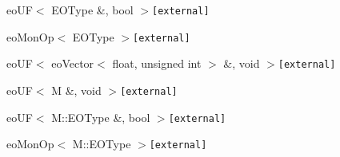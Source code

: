 \begin{CompactList}
\begin{CompactList}
\begin{CompactList}
\item {}
\begin{CompactList}
\item {}
\end{CompactList}
\end{CompactList}
\item eo\-UF$<$ EOType \&, bool $>${\tt  [external]}\begin{CompactList}
\item eo\-Mon\-Op$<$ EOType $>${\tt  [external]}\begin{CompactList}
\item {}
\end{CompactList}
\end{CompactList}
\item eo\-UF$<$ eo\-Vector$<$ float, unsigned int $>$ \&, void $>${\tt  [external]}\begin{CompactList}
\item {}
\end{CompactList}
\item eo\-UF$<$ M \&, void $>${\tt  [external]}\begin{CompactList}
\item {}
\end{CompactList}
\item eo\-UF$<$ M::EOType \&, bool $>${\tt  [external]}\begin{CompactList}
\item eo\-Mon\-Op$<$ M::EOType $>${\tt  [external]}\begin{CompactList}
\item {}
\begin{CompactList}
\item {}
\item {}
\item {}
\end{CompactList}
\end{CompactList}
\end{CompactList}

\end{CompactList}
\end{CompactList}
